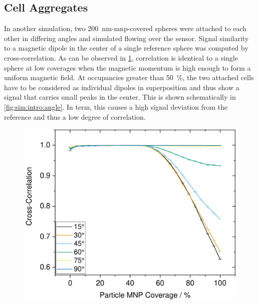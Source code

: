 \subsection{Cell Aggregates}
In another simulation, two \SI{200}{\nano\meter}-\gls{mnp}-covered spheres were attached to each other in differing angles and simulated flowing over the sensor. Signal similarity to a magnetic dipole in the center of a single reference sphere was computed by cross-correlation. As can be observed in \cref{fig:sim:aggregates}, correlation is identical to a single sphere at low coverages when the magnetic momentum is high enough to form a uniform magnetic field. At occupancies greater than \SI{50}{\percent}, the two attached cells have to be considered as individual dipoles in superposition and thus show a signal that carries small peaks in the center. This is shown schematically in \cref{fig:sim:intro:angle}. In term, this causes a high signal deviation from the reference and thus a low degree of correlation.
\begin{figure}
	\centering
	\includegraphics[width=.7\linewidth]{Ressources/Simulation/Aggregates}	
	\label{fig:sim:aggregates}
\end{figure}
\clearpage

